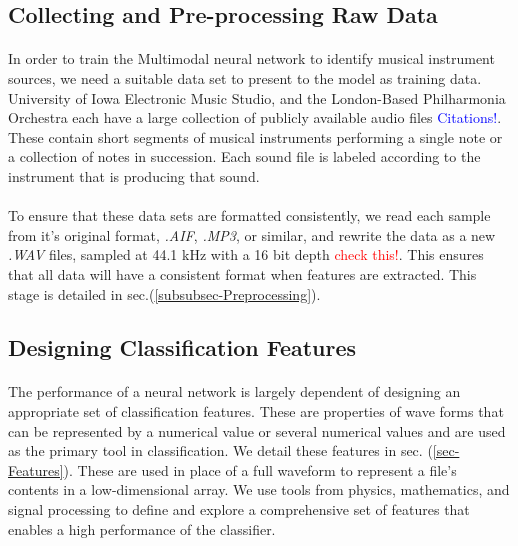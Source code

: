 \documentclass[12pt,letterpaper]{article}
\begin{document}

\subsection{Collecting and Pre-processing Raw Data}

\paragraph*{}In order to train the Multimodal neural network to identify musical instrument sources, we need a suitable data set to present to the model as training data. University of Iowa Electronic Music Studio, and the London-Based Philharmonia Orchestra each have a large collection of publicly available audio files \textcolor{blue}{Citations!}. These contain short segments of musical instruments performing a single note or a collection of notes in succession. Each sound file is labeled according to the instrument that is producing that sound.

\paragraph*{}To ensure that these data sets are formatted consistently, we read each sample from it's original format, \textit{.AIF}, \textit{.MP3}, or similar, and rewrite the data as a new \textit{.WAV} files, sampled at 44.1 kHz with a 16 bit depth \textcolor{red}{check this!}. This ensures that all data will have a consistent format when features are extracted. This stage is detailed in sec.(\ref{subsubsec-Preprocessing}).

\subsection{Designing Classification Features}

\paragraph*{}The performance of a neural network is largely dependent of designing an appropriate set of classification features. These are properties of wave forms that can be represented by a numerical value or several numerical values and are used as the primary tool in classification. We detail these features in sec. (\ref{sec-Features}). These are used in place of a full waveform to represent a file's contents in a low-dimensional array. We use tools from physics, mathematics, and signal processing to define and explore a comprehensive set of features that enables a high performance of the classifier. 
\end{document}
